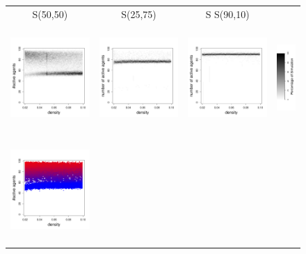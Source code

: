 \documentclass[a4paper]{article}
\begin{document}
\begin{figure}
    \begin{tabular}[H]{cccl}
	S(50,50) & S(25,75) & S S(90,10)\\
	\includegraphics[height=4cm]{img/slice_alive_rep-50.pdf} &
	\includegraphics[height=4cm]{img/slice_alive_rep-75.pdf} &
	\includegraphics[height=4cm]{img/slice_alive_rep-90.pdf} &
	\includegraphics[height=4cm]{img/legNum.pdf} \\
	\includegraphics[height=4cm]{img/slice_spec_rep-50.pdf} &

\end{tabular}
\end{figure}
\end{document}
